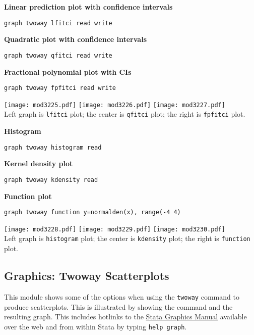 \textbf{Linear prediction plot with confidence intervals}
\begin{lstlisting}
graph twoway lfitci read write
\end{lstlisting}

\textbf{Quadratic plot with confidence intervals}
\begin{lstlisting}
graph twoway qfitci read write
\end{lstlisting}

\textbf{Fractional polynomial plot with CIs}
\begin{lstlisting}
graph twoway fpfitci read write
\end{lstlisting}

\begin{center}
\texttt{[image: mod3225.pdf]}
\texttt{[image: mod3226.pdf]}
\texttt{[image: mod3227.pdf]}\\
Left graph is \lstinline{lfitci} plot; the center is \lstinline{qfitci} plot; the right is \lstinline{fpfitci} plot.
\end{center}



\textbf{Histogram}
\begin{lstlisting}
graph twoway histogram read
\end{lstlisting}

\textbf{Kernel density plot}
\begin{lstlisting}
graph twoway kdensity read
\end{lstlisting}

\textbf{Function plot}
\begin{lstlisting}
graph twoway function y=normalden(x), range(-4 4)
\end{lstlisting}
\begin{center}
\texttt{[image: mod3228.pdf]}
\texttt{[image: mod3229.pdf]}
\texttt{[image: mod3230.pdf]}\\
Left graph is \lstinline{histogram} plot; the center is \lstinline{kdensity} plot; the right is \lstinline{function} plot.
\end{center}


\subsection{Graphics: Twoway Scatterplots}
This module shows some of the options when using the \lstinline{twoway} command to produce scatterplots.  This is illustrated by showing the command and the resulting graph.  This includes hotlinks to the \href{http://www.stata.com/help.cgi?graph}{Stata Graphics Manual} available over the web and from within Stata by typing \lstinline{help graph}.

